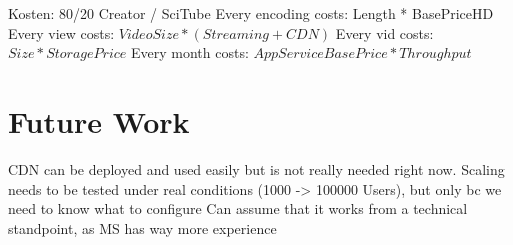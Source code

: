 \documentclass[english]{lni}
\begin{document}
Kosten: 80/20 Creator / SciTube
Every encoding costs: Length * BasePriceHD
Every view costs: $VideoSize * (Streaming+CDN)$
Every vid costs: $Size * StoragePrice$
Every month costs: $AppServiceBasePrice * Throughput$

\section{Future Work}
CDN can be deployed and used easily but is not really needed right now. 
Scaling needs to be tested under real conditions (1000 -> 100000 Users), but only bc we need to know what to configure
Can assume that it works from a technical standpoint, as MS has way more experience
    
\newpage
\appendix




\end{document}
